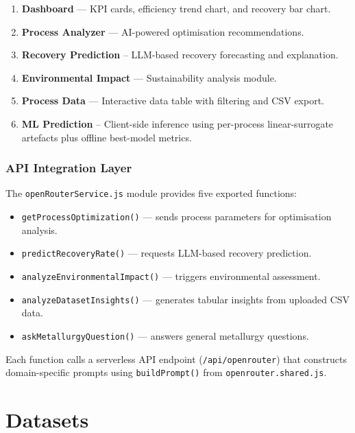 \documentclass[12pt,a4paper]{report}
\newcommand{\code}[1]{\texttt{#1}}
\begin{document}
\begin{enumerate}[nosep]
  \item \textbf{Dashboard} — KPI cards, efficiency trend chart, and recovery bar chart.
  \item \textbf{Process Analyzer} — AI-powered optimisation recommendations.
  \item \textbf{Recovery Prediction} -- LLM-based recovery forecasting and explanation.
  \item \textbf{Environmental Impact} — Sustainability analysis module.
  \item \textbf{Process Data} — Interactive data table with filtering and CSV export.
  \item \textbf{ML Prediction} -- Client-side inference using per-process linear-surrogate artefacts plus offline best-model metrics.
\end{enumerate}

\subsection{API Integration Layer}

The \code{openRouterService.js} module provides five exported functions:

\begin{itemize}[nosep]
  \item \code{getProcessOptimization()} — sends process parameters for optimisation analysis.
  \item \code{predictRecoveryRate()} — requests LLM-based recovery prediction.
  \item \code{analyzeEnvironmentalImpact()} — triggers environmental assessment.
  \item \code{analyzeDatasetInsights()} — generates tabular insights from uploaded CSV data.
  \item \code{askMetallurgyQuestion()} — answers general metallurgy questions.
\end{itemize}

Each function calls a serverless API endpoint (\code{/api/openrouter}) that constructs domain-specific prompts using \code{buildPrompt()} from \code{openrouter.shared.js}.


\chapter{Datasets}
\label{ch:datasets}
\end{document}
